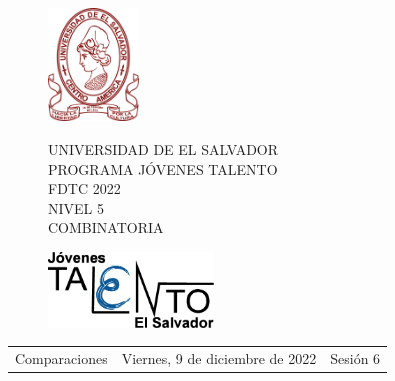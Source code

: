 \documentclass[12pt]{article}
\newcommand{\tema}{Comparaciones}
\newcommand{\fecha}{Viernes, 9 de diciembre de 2022}
\newcommand{\sesion}{Sesión 6}
\begin{document}
\thispagestyle{empty}

\begin{figure}[h] 
	\begin{minipage}[b]{0.26\textwidth}
		\begin{center}
			\includegraphics[height=3cm]{Logos/UES.png}
			\par\end{center}
	\end{minipage} 
	\begin{minipage}[b]{0.46\textwidth}
		\begin{center}
			UNIVERSIDAD DE EL SALVADOR\\ [0.1cm]
			PROGRAMA JÓVENES TALENTO\\ [0.1cm]
	        FDTC 2022\\ [0.1cm]
                NIVEL 5\\ [0.1cm]
			COMBINATORIA 
			\par\end{center}
	\end{minipage} 
	\begin{minipage}[b]{0.05\textwidth}
		\begin{center}
			\includegraphics[height=2cm]{Logos/LOGO PJT.png}
			\par\end{center}
	\end{minipage}
\end{figure}

\begin{center}
    \begin{tabular}{p{4.5cm} p{7cm} p{4.5cm}}
        \tema & \centering\fecha & \hfill\sesion
    \end{tabular}
\end{center}
\end{document}
